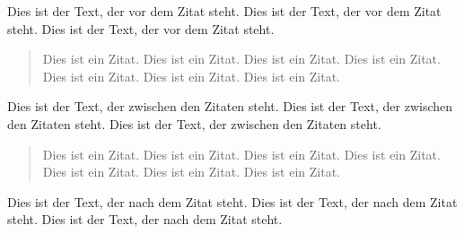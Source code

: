 \documentclass[12pt,a4paper]{scrbook}
\begin{document}
Dies ist der Text, der vor dem Zitat steht. 
Dies ist der Text, der vor dem Zitat steht. 
Dies ist der Text, der vor dem Zitat steht. 

\begin{quote}
	Dies ist ein Zitat. 
	Dies ist ein Zitat. 
	Dies ist ein Zitat. 
	Dies ist ein Zitat. 
	Dies ist ein Zitat. 
	Dies ist ein Zitat. 
	Dies ist ein Zitat. 
\end{quote}

\renewenvironment{quote}{%
	\begin{quotation}%
	\noindent\glqq\ignorespaces}{%
	\ignorespaces\grqq\end{quotation}%
}%

Dies ist der Text, der zwischen den Zitaten steht. 
Dies ist der Text, der zwischen den Zitaten steht.
Dies ist der Text, der zwischen den Zitaten steht.

\begin{quote}
	Dies ist ein Zitat. 
	Dies ist ein Zitat. 
	Dies ist ein Zitat. 
	Dies ist ein Zitat. 
	Dies ist ein Zitat. 
	Dies ist ein Zitat. 
	Dies ist ein Zitat.%
\end{quote}

Dies ist der Text, der nach dem Zitat steht. 
Dies ist der Text, der nach dem Zitat steht. 
Dies ist der Text, der nach dem Zitat steht. 
\end{document}

